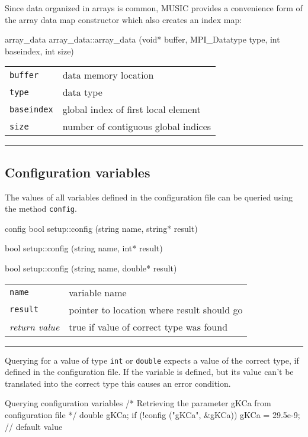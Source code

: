 \documentclass[a4paper]{report}
\makeatletter
\newenvironment{parameters}%
{\begin{tabular}{@{\hspace{2em}}lp{0.6\textwidth}}}%
{\end{tabular}\par\vspace{1mm}\par\hrule\par\vspace{5mm}}
\makeatother
\begin{document}
Since data organized in arrays is common, MUSIC provides a convenience
form of the array data map constructor which also creates an index
map:

\begin{head}{array_data}
  array_data::array_data (void* buffer,
                          MPI_Datatype type,
                          int  baseindex,
                          int size)
\end{head}
\begin{parameters}
  \lstinline|buffer|    & data memory location \\
  \lstinline|type|	& data type \\
  \lstinline|baseindex| & global index of first local element \\
  \lstinline|size|      & number of contiguous global indices \\
\end{parameters}


\subsection{Configuration variables}

The values of all variables defined in the configuration file can be
queried using the method \lstinline|config|.

\begin{head}{config}
  bool setup::config (string name, string* result)

  bool setup::config (string name, int* result)

  bool setup::config (string name, double* result)
\end{head}
\begin{parameters}
  \lstinline|name|     & variable name \\
  \lstinline|result|  & pointer to location where result should go \\
  \emph{return value} & true if value of correct type was found \\
\end{parameters}

Querying for a value of type \lstinline|int| or \lstinline|double|
expects a value of the correct type, if defined in the configuration
file.  If the variable is defined, but its value can't be translated
into the correct type this causes an error condition.

\begin{code}{Querying configuration variables}
/* Retrieving the parameter gKCa
   from configuration file */
double gKCa;
if (!config ("gKCa", &gKCa))
  gKCa = 29.5e-9; // default value
\end{code}
\end{document}
